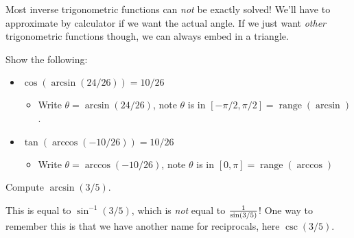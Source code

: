 \begin{remark}

Most inverse trigonometric functions can \emph{not} be exactly solved!
We'll have to approximate by calculator if we want the actual angle. If
we just want \emph{other} trigonometric functions though, we can always
embed in a triangle.

\end{remark}

\begin{example}[?]

Show the following:

\begin{itemize}
\tightlist
\item
  \(\cos(\arcsin(24/26)) = 10/26\)

  \begin{itemize}
  \tightlist
  \item
    Write \(\theta = \arcsin(24/26)\), note \(\theta\) is in
    \([-\pi/2, \pi/2] = \mathop{\mathrm{range}}(\arcsin)\).
  \end{itemize}
\item
  \(\tan(\arccos(-10/26)) = 10/26\)

  \begin{itemize}
  \tightlist
  \item
    Write \(\theta = \arccos(-10/26)\), note \(\theta\) is in
    \([0, \pi] = \mathop{\mathrm{range}}(\arccos)\)
  \end{itemize}
\end{itemize}

\end{example}

\begin{exercise}[?]

Compute \(\arcsin(3/5)\).

\end{exercise}

\begin{warnings}

This is equal to \(\sin^{-1}(3/5)\), which is \emph{not} equal to
\({1\over \sin(3/5)}\)! One way to remember this is that we have another
name for reciprocals, here \(\csc(3/5)\).

\end{warnings}

